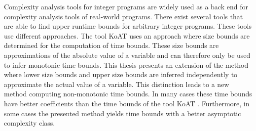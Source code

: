 Complexity analysis tools for integer programs are widely used as a back end for complexity analysis tools of real-world programs.
There exist several tools that are able to find upper runtime bounds for arbitrary integer programs.
These tools use different approaches.
The tool KoAT \cite{koat} uses an approach where size bounds are determined for the computation of time bounds.
These size bounds are approximations of the absolute value of a variable and can therefore only be used to infer monotonic time bounds.
This thesis presents an extension of the method where lower size bounds and upper size bounds are inferred independently to approximate the actual value of a variable.
This distinction leads to a new method computing non-monotonic time bounds.
In many cases these time bounds have better coefficients than the time bounds of the tool KoAT \cite{koat}.
Furthermore, in some cases the presented method yields time bounds with a better asymptotic complexity class. 

